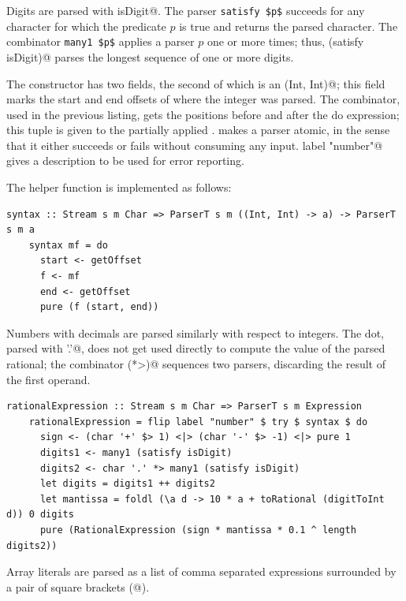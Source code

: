 \documentclass[UdineBachThesis,american,11pt]{PhdThesis}
\begin{document}
  Digits are parsed with \lstinline@satisfy isDigit@. The parser
  \lstinline[mathescape]@satisfy $p$@ succeeds for any character for which the
  predicate $p$ is true and returns the parsed character. The combinator
  \lstinline[mathescape]@many1 $p$@ applies a parser $p$ one or more times;
  thus,  (satisfy isDigit)@ parses the longest sequence of one
  or more digits.

  The constructor \lstinline@IntegerExpression@ has two fields, the second of
  which is an \lstinline@(Int, Int)@; this field marks the start and end offsets
  of where the integer was parsed. The \lstinline@syntax@ combinator, used in
  the previous listing, gets the positions before and after the do expression;
  this tuple is given to the partially applied \lstinline@IntegerExpression@.
  \lstinline@try@ makes a parser atomic, in the sense that it either succeeds or
  fails without consuming any input. \lstinline@flip label "number"@ gives a
  description to be used for error reporting.

  The helper function \lstinline@syntax@ is implemented as follows:

  \begin{lstlisting}[gobble=4,basicstyle=\ttfamily\small]
    syntax :: Stream s m Char => ParserT s m ((Int, Int) -> a) -> ParserT s m a
    syntax mf = do
      start <- getOffset
      f <- mf
      end <- getOffset
      pure (f (start, end))
  \end{lstlisting}

  Numbers with decimals are parsed similarly with respect to integers. The dot,
  parsed with \lstinline@char '.'@, does not get used directly to compute the
  value of the parsed rational; the combinator \lstinline@(*>)@ sequences two
  parsers, discarding the result of the first operand.

  \begin{lstlisting}[gobble=4,basicstyle=\ttfamily\small]
    rationalExpression :: Stream s m Char => ParserT s m Expression
    rationalExpression = flip label "number" $ try $ syntax $ do
      sign <- (char '+' $> 1) <|> (char '-' $> -1) <|> pure 1
      digits1 <- many1 (satisfy isDigit)
      digits2 <- char '.' *> many1 (satisfy isDigit)
      let digits = digits1 ++ digits2
      let mantissa = foldl (\a d -> 10 * a + toRational (digitToInt d)) 0 digits
      pure (RationalExpression (sign * mantissa * 0.1 ^ length digits2))
  \end{lstlisting}

  Array literals are parsed as a list of comma separated expressions surrounded
  by a pair of square brackets (\lstinline@[@, \lstinline@]@).
\end{document}
